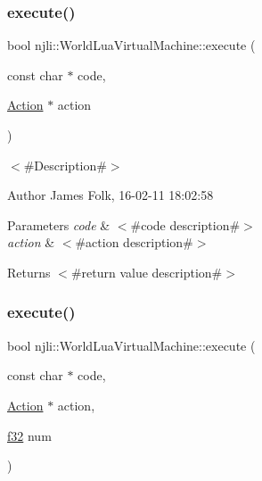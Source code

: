 \mbox{\label{classnjli_1_1_world_lua_virtual_machine_a02bcf617fdf1b7958846e585e870506e}} 
\subsubsection{\texorpdfstring{execute()}{execute()}\hspace{0.1cm}{\footnotesize\ttfamily [25/33]}}
{\footnotesize\ttfamily bool njli\+::\+World\+Lua\+Virtual\+Machine\+::execute (\begin{DoxyParamCaption}\item[{const char $\ast$}]{code,  }\item[{\mbox{\hyperlink{classnjli_1_1_action}{Action}} $\ast$}]{action }\end{DoxyParamCaption})}



$<$\#\+Description\#$>$ 

\begin{DoxyAuthor}{Author}
James Folk, 16-\/02-\/11 18\+:02\+:58
\end{DoxyAuthor}

\begin{DoxyParams}{Parameters}
{\em code} & $<$\#code description\#$>$ \\
\hline
{\em action} & $<$\#action description\#$>$\\
\hline
\end{DoxyParams}
\begin{DoxyReturn}{Returns}
$<$\#return value description\#$>$ 
\end{DoxyReturn}
\mbox{\label{classnjli_1_1_world_lua_virtual_machine_a4fce503e637d2425c53e9e6afd486e02}} 
\subsubsection{\texorpdfstring{execute()}{execute()}\hspace{0.1cm}{\footnotesize\ttfamily [26/33]}}
{\footnotesize\ttfamily bool njli\+::\+World\+Lua\+Virtual\+Machine\+::execute (\begin{DoxyParamCaption}\item[{const char $\ast$}]{code,  }\item[{\mbox{\hyperlink{classnjli_1_1_action}{Action}} $\ast$}]{action,  }\item[{\mbox{\hyperlink{_util_8h_a5f6906312a689f27d70e9d086649d3fd}{f32}}}]{num }\end{DoxyParamCaption})}



